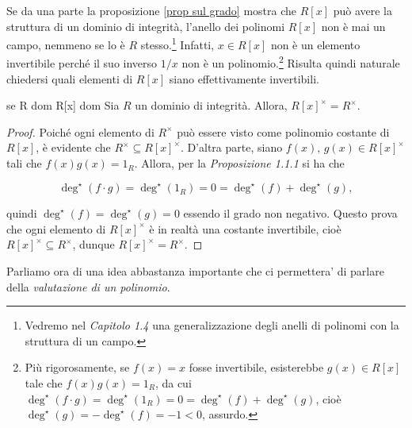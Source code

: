 
\noindent Se da una parte la proposizione \ref{prop sul grado} mostra che $R[x]$ può avere la struttura di un dominio di integrità, l'anello dei polinomi $R[x]$ non è mai un campo, nemmeno se lo è $R$ stesso.\footnote{Vedremo nel \emph{Capitolo 1.4} una generalizzazione degli anelli di polinomi con la struttura di un campo.} Infatti, $x\in R[x]$ non è un elemento invertibile perché il suo inverso $1/x$ non è un polinomio.\footnote{Più rigorosamente, se $f(x)=x$ fosse invertibile, esisterebbe $g(x)\in R[x]$ tale che $f(x)g(x)=1_R$, da cui $\deg^{\star}(f\cdot g)=\deg^{\star}(1_R)=0=\deg^{\star}(f)+\deg^{\star}(g)$, cioè $\deg^{\star}(g)=-\deg^{\star}(f)=-1<0$, assurdo.} Risulta quindi naturale chiedersi quali elementi di $R[x]$ siano effettivamente invertibili.


\begin{prop}[]{se R dom R[x] dom}
Sia $R$ un dominio di integrità. Allora, $R[x]^{\times}=R^{\times}$.
\end{prop}
\vspace{-4mm}
\begin{proof}
Poiché ogni elemento di $R^{\times}$ può essere visto come polinomio costante di~$R[x]$, è evidente che 
$R^{\times}\subseteq R[x]^{\times}$. D'altra parte, siano $f(x),\,g(x)\in R[x]^{\times}$ tali che 
$f(x)g(x)=1_R$. Allora, per la \emph{Proposizione 1.1.1} si ha che 

\[\deg^{\star}(f\cdot g)=\deg^{\star}(1_R)=0=\deg^{\star}(f)+\deg^{\star}(g),\] 

\noindent quindi $\deg^{\star}(f)=\deg^{\star}(g)=0$ essendo il grado non negativo. Questo prova che 
ogni elemento di $R[x]^{\times}$ è in realtà una costante invertibile, cioè 
$R[x]^{\times}\subseteq R^{\times}$, dunque $R[x]^{\times}=R^{\times}$.
\end{proof}

\noindent Parliamo ora di una idea abbastanza importante che ci permettera' di parlare della \emph{valutazione di un polinomio}.

